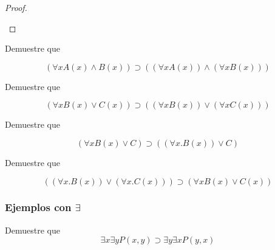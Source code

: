 \documentclass{article}
\begin{document}
\begin{example}
\begin{proof}
        \begin{prooftree}
        \end{prooftree}
    \end{proof}
\end{example}

\begin{example}
    Demuestre que

    $$
        (\forall x A(x) \land B(x)) \supset ((\forall x A (x)) \land (\forall x B (x)))
    $$
\end{example}

\begin{example}
    Demuestre que

    $$
        (\forall x B(x) \lor C(x)) \supset ((\forall x B(x)) \lor (\forall x C(x)))
    $$
\end{example}

\begin{example}
    Demuestre que

    $$
        (\forall x B(x) \lor C) \supset ((\forall x. B(x)) \lor C)
    $$
\end{example}

\begin{example}
    Demuestre que

    $$
        ((\forall x. B(x)) \lor (\forall x . C(x))) \supset (\forall x B(x) \lor C(x))
    $$
\end{example}


\subsubsection{Ejemplos con $\exists$}

\begin{example}
    Demuestre que 
    $$
        \exists x \exists y P(x, y) \supset \exists y \exists x P(y, x)
    $$ 
\end{example}
\end{document}
